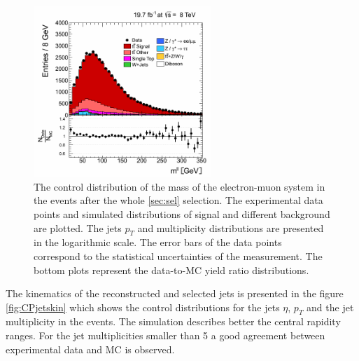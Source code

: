  \begin{figure}[h]
  \centering
  \includegraphics[width=0.6\textwidth]{04_event_reconstruction/plots/basic_dilepton_mass_step7.png}
  \caption{The control distribution of the mass of the electron-muon system in the events after the whole \ref{sec:sel} selection. 
  The experimental data points and simulated distributions of signal and different background are plotted. The jets $p_{T}$ and multiplicity 
  distributions are presented in the logarithmic scale. The error bars of the data points
  correspond to the statistical uncertainties of the measurement. The bottom plots represent the data-to-MC yield ratio distributions.}
  \label{fig:CPmll}
 \end{figure}
 
The kinematics of the reconstructed and selected jets is presented in the figure \ref{fig:CPjetskin} which shows the control distributions for the
jets $\eta$, $p_{T}$ and the jet multiplicity in the events. The simulation describes better the central rapidity ranges. For the jet multiplicities
smaller than 5 a good agreement between experimental data and MC is observed.
 
